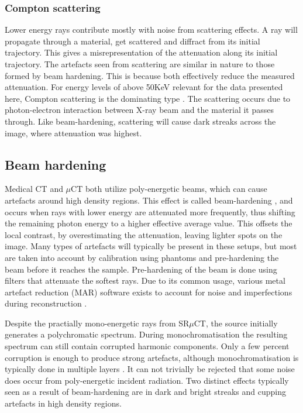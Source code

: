 \subsubsection{Compton scattering}

Lower energy rays contribute mostly with noise from scattering effects. A ray will propagate through
a material, get scattered and diffract from its initial trajectory. This gives a misrepresentation
of the attenuation along its initial trajectory. The artefacts seen from scattering are similar in
nature to those formed by beam hardening. This is because both effectively reduce the measured
attenuation. For energy levels of above 50KeV relevant for the data presented here, Compton
scattering is the dominating type \citep{compton}. The scattering occurs due to photon-electron
interaction between X-ray beam and the material it passes through. Like beam-hardening, scattering
will cause dark streaks across the image, where attenuation was highest.

\subsection{Beam hardening}\label{sec:beam-hardening}

Medical CT and $\mu$CT both utilize poly-energetic beams, which can cause artefacts around high
density regions. This effect is called beam-hardening \citep{beamhardening}, and occurs when rays
with lower energy are attenuated more frequently, thus shifting the remaining photon energy to a
higher effective average value. This offsets the local contrast, by overestimating the attenuation,
leaving lighter spots on the image. Many types of artefacts will typically be present in these
setups, but most are taken into account by calibration using phantoms and pre-hardening the beam
before it reaches the sample. Pre-hardening of the beam is done using filters that attenuate the
softest rays. Due to its common usage, various metal artefact reduction (MAR) software exists to
account for noise and imperfections during reconstruction \citep{mar1}\citep{mar2}.

Despite the practially mono-energetic rays from SR$\mu$CT, the source initially generates a
polychromatic spectrum. During monochromatisation the resulting spectrum can still contain
corrupted harmonic components. Only a few percent corruption is enough to produce strong
artefacts, although monochromatisation is typically done in multiple layers \citep{srnoise}.
It can not trivially be rejected that some noise does occur from poly-energetic incident radiation.
Two distinct effects typically seen as a result of beam-hardening are in dark and bright streaks
and cupping artefacts in high density regions.

